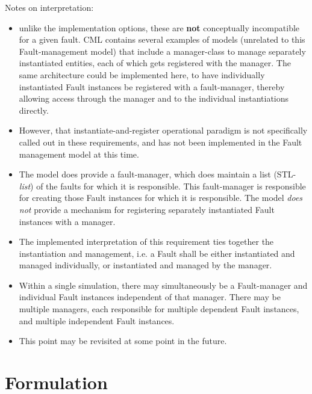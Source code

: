 \documentclass[11pt,fleqn]{report}
\begin{document}
Notes on interpretation:
\begin{itemize}
 \item unlike the implementation options, these are \textbf{not} conceptually
   incompatible for a given fault.
   CML contains several examples of models (unrelated to this Fault-management
   model) that include a manager-class to manage separately instantiated
   entities, each of which gets registered with the manager. The same
   architecture could be implemented here, to have individually instantiated
   Fault instances be registered with a fault-manager, thereby allowing access
   through the manager and to the individual instantiations directly.
 \item However, that instantiate-and-register operational paradigm is not
   specifically called out in these requirements, and has not been implemented
   in the Fault management model at this time.
 \item The model does provide a fault-manager, which does maintain a
   list (STL-\textit{list}) of the faults for which it is responsible. This
   fault-manager is responsible for creating those Fault instances for which
   it is responsible. The model \textit{does
   not} provide a mechanism for registering separately instantiated Fault
   instances with a manager.
 \item The implemented interpretation of this requirement ties together the
   instantiation and management, i.e. a Fault shall be either
   instantiated and managed individually, or instantiated and managed by the
   manager.
 \item Within a single simulation, there may simultaneously be a Fault-manager
   and individual Fault instances independent of that manager. There may be
   multiple managers, each responsible for multiple dependent Fault instances,
   and multiple independent Fault instances.
 \item This point may be revisited at some point in the future.
\end{itemize}

\chapter {Formulation}
\end{document}

